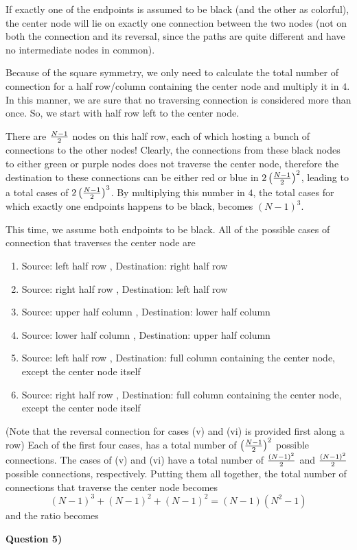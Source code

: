 \documentclass[10pt,letterpaper]{article}
\newcommand{\Q}[1]{\textbf{Question #1)}}
\begin{document}
\begin{enumerate}[label=\alph*)]
If exactly one of the endpoints is assumed to be black (and the other as colorful), the center node will lie on exactly one connection between the two nodes (not on both the connection and its reversal, since the paths are quite different and have no intermediate nodes in common).

Because of the square symmetry, we only need to calculate the total number of connection for a half row/column containing the center node and multiply it in $4$. In this manner, we are sure that no traversing connection is considered more than once. So, we start with half row left to the center node.

There are $N-1\over 2$ nodes on this half row, each of which hosting a bunch of connections to the other nodes! Clearly, the connections from these black nodes to either green or purple nodes does not traverse the center node, therefore the destination to these connections can be either red or blue in $2\left({N-1\over 2}\right)^2$, leading to a total cases of $2\left({N-1\over 2}\right)^3$. By multiplying this number in $4$, the total cases for which exactly one endpoints happens to be black, becomes $(N-1)^3$.

This time, we assume both endpoints to be black. All of the possible cases of connection that traverses the center node are
\begin{enumerate}[label=\roman*. ]
\item
Source: left half row , Destination: right half row
\item
Source: right half row , Destination: left half row
\item
Source: upper half column , Destination: lower half column
\item
Source: lower half column , Destination: upper half column
\item
Source: left half row , Destination: full column containing the center node, except the center node itself
\item
Source: right half row , Destination: full column containing the center node, except the center node itself
\end{enumerate}
(Note that the reversal connection for cases (v) and (vi) is provided first along a row) Each of the first four cases, has a total number of $\left({N-1\over 2}\right)^2$ possible connections. The cases of (v) and (vi) have a total number of ${(N-1)^2\over 2}$ and $(N-1)^2\over 2$ possible connections, respectively. Putting them all together, the total number of connections that traverse the center node becomes
$$
(N-1)^3+(N-1)^2+(N-1)^2=(N-1)(N^2-1)
$$
and the ratio becomes
\end{enumerate}
\Q5
\end{document}
